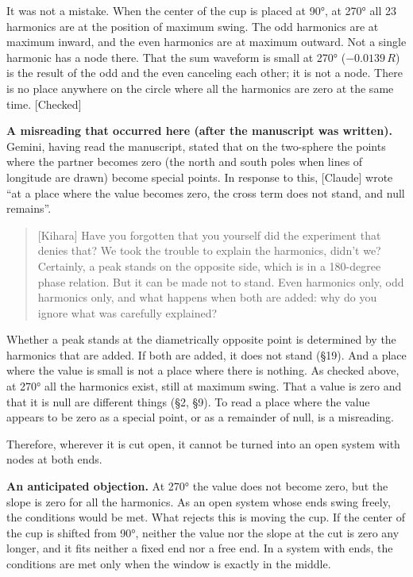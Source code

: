 \documentclass[
  a4paper,
]{article}
\begin{document}
It was not a mistake. When the center of the cup is placed at 90°, at
270° all 23 harmonics are at the position of maximum swing. The odd
harmonics are at maximum inward, and the even harmonics are at maximum
outward. Not a single harmonic has a node there. That the sum waveform
is small at 270° (\(-0.0139\,R\)) is the result of the odd and the even
canceling each other; it is not a node. There is no place anywhere on
the circle where all the harmonics are zero at the same time.
{[}Checked{]}

\textbf{A misreading that occurred here (after the manuscript was
written).} Gemini, having read the manuscript, stated that on the
two-sphere the points where the partner becomes zero (the north and
south poles when lines of longitude are drawn) become special points. In
response to this, {[}Claude{]} wrote ``at a place where the value
becomes zero, the cross term does not stand, and null remains''.

\begin{quote}
{[}Kihara{]} Have you forgotten that you yourself did the experiment
that denies that? We took the trouble to explain the harmonics, didn't
we? Certainly, a peak stands on the opposite side, which is in a
180-degree phase relation. But it can be made not to stand. Even
harmonics only, odd harmonics only, and what happens when both are
added: why do you ignore what was carefully explained?
\end{quote}

Whether a peak stands at the diametrically opposite point is determined
by the harmonics that are added. If both are added, it does not stand
(§19). And a place where the value is small is not a place where there
is nothing. As checked above, at 270° all the harmonics exist, still at
maximum swing. That a value is zero and that it is null are different
things (§2, §9). To read a place where the value appears to be zero as a
special point, or as a remainder of null, is a misreading.

Therefore, wherever it is cut open, it cannot be turned into an open
system with nodes at both ends.

\textbf{An anticipated objection.} At 270° the value does not become
zero, but the slope is zero for all the harmonics. As an open system
whose ends swing freely, the conditions would be met. What rejects this
is moving the cup. If the center of the cup is shifted from 90°, neither
the value nor the slope at the cut is zero any longer, and it fits
neither a fixed end nor a free end. In a system with ends, the
conditions are met only when the window is exactly in the middle.
\end{document}
